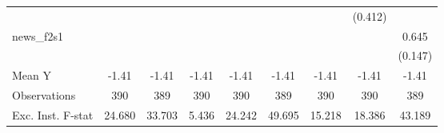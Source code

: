 {\begin{tabular}{l*{8}{c}}
            &                     &                     &                     &                     &                     &                     &     (0.412)         &                     \\
\addlinespace
news\_f2s1   &                     &                     &                     &                     &                     &                     &                     &       0.645\sym{***}\\
            &                     &                     &                     &                     &                     &                     &                     &     (0.147)         \\
\midrule
Mean Y      &       -1.41         &       -1.41         &       -1.41         &       -1.41         &       -1.41         &       -1.41         &       -1.41         &       -1.41         \\
Observations&         390         &         389         &         390         &         390         &         389         &         390         &         390         &         389         \\
Exc. Inst. F-stat&      24.680         &      33.703         &       5.436         &      24.242         &      49.695         &      15.218         &      18.386         &      43.189         \\
\bottomrule
\end{tabular}
}
